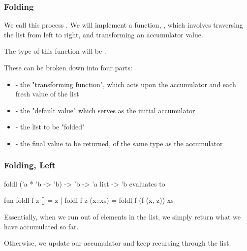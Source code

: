 \documentclass[aspectratio=169, handout]{beamer}
\begin{document}
\begin{frame}[fragile]
  \frametitle{Folding}

  We call this process . We will implement a function, , which
  involves traversing the list from left to right, and transforming an accumulator
  value.

  \pause
  \vspace{\fill}

  The type of this function will be .

  \pause
  \vspace{\fill}

  These can be broken down into four parts:
  \pause
  \begin{itemize}
    \item {} - the "transforming function", which acts upon the
    accumulator and each fresh value of the list \pause
    \item {} - the "default value" which serves as the initial accumulator \pause
    \item {} - the list to be "folded" \pause
    \item {} - the final value to be returned, of the same type as the accumulator
  \end{itemize}
\end{frame}

\begin{frame}[fragile]
  \frametitle{Folding, Left}

  \spec
    {foldl}
    {('a * 'b -> 'b) -> 'b -> 'a list -> 'b}
    {}
    { evaluates to }

  \pause
  \begin{codeblock}
    fun foldl f z [] = z
      | foldl f z (x::xs) = foldl f (f (x, z)) xs
  \end{codeblock}

  \pause
  \vspace{\fill}

  Essentially, when we run out of elements in the list, we simply return
  what we have accumulated so far.

  \pause
  \vspace{\fill}

  Otherwise, we update our accumulator and keep recursing through the list.
\end{frame}
\end{document}
